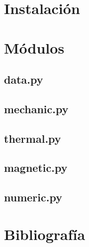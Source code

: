 \documentclass[12pt]{book}
\begin{document}
\chapter{Instalación}

\chapter{Módulos}
	\section{data.py}
	\section{mechanic.py}
	\section{thermal.py}
	\section{magnetic.py}
	\section{numeric.py}

\chapter{Bibliografía}
\end{document}
